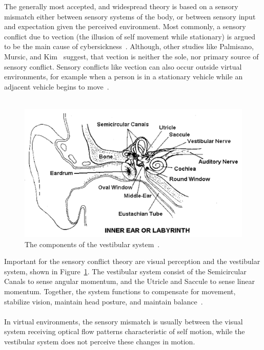 The generally most accepted, and widespread theory is based on a sensory mismatch either between sensory systems of the
body, or between sensory input and expectation given the perceived environment.
Most commonly, a sensory conflict due to vection (the illusion of self movement while stationary) is argued to be the
main cause of cybersickness~\cite{Weech2018,Keshavarz2019}.
Although, other studies like Palmisano, Mursic, and Kim~\cite{Palmisano2017} suggest, that vection is neither the
sole, nor primary source of sensory conflict.
Sensory conflicts like vection can also occur outside virtual environments, for example when a person is in a
stationary vehicle while an adjacent vehicle begins to move~\cite{LaViola2000}.
\\
\\
\begin{figure}[h]
    \centering
    \includegraphics[width=\textwidth]{content/2_related_work/img/VestibularSystem[LaViola2000]}
    \caption{The components of the vestibular system~\cite{LaViola2000}.}
    \label{fig:vestibular-system}
\end{figure}
Important for the sensory conflict theory are visual perception and the vestibular system, shown in
Figure~\ref{fig:vestibular-system}.
The vestibular system consist of the Semicircular Canals to sense angular momentum, and the Utricle and Saccule to
sense linear momentum.
Together, the system functions to compensate for movement, stabilize vision, maintain head posture, and maintain
balance~\cite{Walker2014}.
\\
\\
In virtual environments, the sensory mismatch is usually between the visual system receiving optical flow patterns
characteristic of self motion, while the vestibular system does not perceive these changes in motion.
